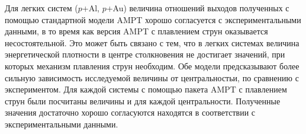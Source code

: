 Для легких систем ($p$+Al, $p$+Au) величина отношений выходов  полученных с помощью стандартной модели AMPT хорошо согласуется с экспериментальными данными, в то время как версия AMPT с плавлением струн оказывается несостоятельной. Это может быть связано с тем, что в легких системах величина энергетической плотности в центре столкновения не достигает значений, при которых механизм плавления струн необходим. Обе модели предсказывают более сильную зависимость исследуемой величины от центральностьи, по сравнению с экспериментом.
Для каждой системы с помощью пакета AMPT с плавлением струн были посчитаны величины  и  для каждой центральности. Полученные значения достаточно хорошо согласуются находятся в соответствии с экспериментальными данными.

